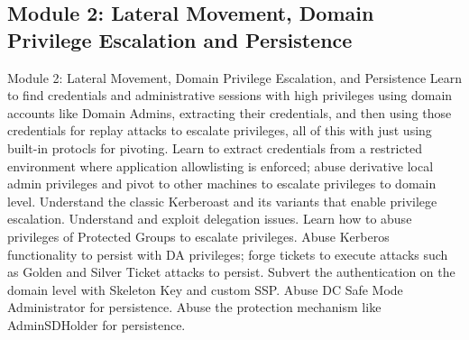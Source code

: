 \subsection{Module 2: Lateral Movement, Domain Privilege Escalation and Persistence}
Module 2: Lateral Movement, Domain Privilege Escalation, and Persistence
Learn to find credentials and administrative sessions with high privileges using domain accounts like Domain Admins, extracting their credentials, and then using those credentials for replay attacks to escalate privileges, all of this with just using built-in protocls for pivoting.
Learn to extract credentials from a restricted environment where application allowlisting is enforced; abuse derivative local admin privileges and pivot to other machines to escalate privileges to domain level.
Understand the classic Kerberoast and its variants that enable privilege escalation.
Understand and exploit delegation issues.
Learn how to abuse privileges of Protected Groups to escalate privileges.
Abuse Kerberos functionality to persist with DA privileges; forge tickets to execute attacks such as Golden and Silver Ticket attacks to persist.
Subvert the authentication on the domain level with Skeleton Key and custom SSP.
Abuse DC Safe Mode Administrator for persistence.
Abuse the protection mechanism like AdminSDHolder for persistence.

\












